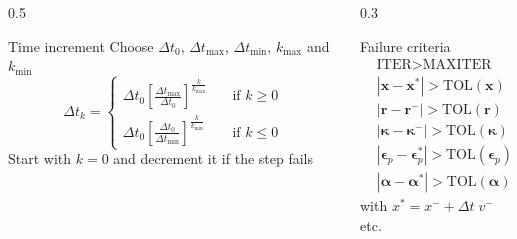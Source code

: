 \documentclass[8pt]{beamer}
\numberwithin{equation}{section}
\theoremstyle{definition}
\begin{document}
\begin{frame}
\begin{columns}
\begin{column}{0.5\framewidth}
\begin{block}{Time increment}
Choose $\Delta t_0$, $\Delta t_\text{max}$, $\Delta t_\text{min}$, $k_\text{max}$ and $k_\text{min}$
\[
\Delta t_k=
\begin{cases}
\Delta t_0\left[\frac{\Delta t_\text{max}}{\Delta t_0}\right]^\frac{k}{k_\text{max}}\quad & \text{if $k\ge0$} \\
\Delta t_0\left[\frac{\Delta t_0}{\Delta t_\text{min}}\right]^\frac{k}{k_\text{min}} & \text{if $k\le0$}
\end{cases}
\]
Start with $k=0$ and decrement it if the step fails
\end{block}
\end{column}
\begin{column}{0.3\framewidth}
\begin{block}{\centering Failure criteria}
\vspace{-2em}
\begin{align*}
& \text{ITER}>\text{MAXITER} \\
&|\boldsymbol{x}-\boldsymbol{x}^*|> \text{TOL}(\boldsymbol{x}) \\
&|\boldsymbol{r}-\boldsymbol{r}^-|> \text{TOL}(\boldsymbol{r}) \\
&|\boldsymbol{\kappa}-\boldsymbol{\kappa}^-|> \text{TOL}(\boldsymbol{\kappa}) \\
&|\boldsymbol{\epsilon}_p-\boldsymbol{\epsilon}_p^*|> \text{TOL}(\boldsymbol{\epsilon}_p) \\
&|\boldsymbol{\alpha}-\boldsymbol{\alpha}^*|> \text{TOL}(\boldsymbol{\alpha}).
\end{align*}
with $x^*=x^-+\Delta t\;v^-$ etc.
\end{block}
\end{column}
\end{columns}

\end{frame}
\end{document}
